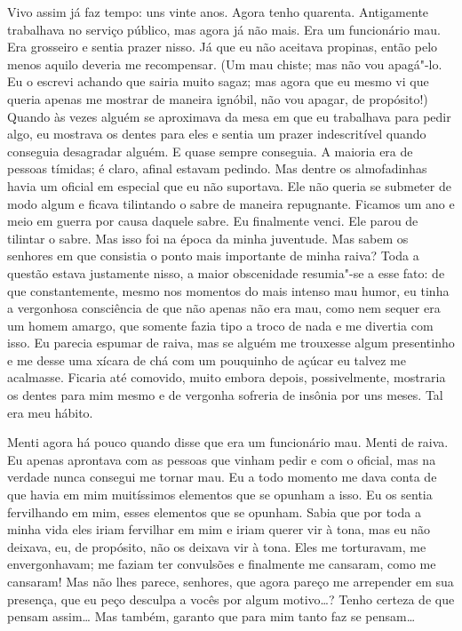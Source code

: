 Vivo assim já faz tempo: uns vinte anos. Agora tenho quarenta.
Antigamente trabalhava no serviço público, mas agora já não mais. Era
um funcionário mau. Era grosseiro e sentia prazer nisso. Já que eu não
aceitava propinas, então pelo menos aquilo deveria me recompensar. (Um
mau chiste; mas não vou apagá"-lo. Eu o escrevi achando que sairia muito
sagaz; mas agora que eu mesmo vi que queria apenas me mostrar de
maneira ignóbil, não vou apagar, de propósito!) Quando às vezes alguém
se aproximava da mesa em que eu trabalhava para pedir algo, eu mostrava
os dentes para eles e sentia um prazer indescritível quando conseguia
desagradar alguém. E quase sempre conseguia. A maioria era de pessoas
tímidas; é claro, afinal estavam pedindo. Mas dentre os almofadinhas
havia um oficial em especial que eu não suportava. Ele não queria se
submeter de modo algum e ficava tilintando o sabre de maneira
repugnante. Ficamos um ano e meio em guerra por causa daquele sabre. Eu
finalmente venci. Ele parou de tilintar o sabre. Mas isso foi na época
da minha juventude. Mas sabem os senhores em que consistia o ponto mais
importante de minha raiva? Toda a questão estava justamente nisso, a
maior obscenidade resumia"-se a esse fato: de que constantemente, mesmo
nos momentos do mais intenso mau humor, eu tinha a vergonhosa
consciência de que não apenas não era mau, como nem sequer era um homem
amargo, que somente fazia tipo a troco de nada e me divertia com isso.
Eu parecia espumar de raiva, mas se alguém me trouxesse algum
presentinho e me desse uma xícara de chá com um pouquinho de açúcar eu
talvez me acalmasse. Ficaria até comovido, muito embora depois,
possivelmente, mostraria os dentes para mim mesmo e de vergonha
sofreria de insônia por uns meses. Tal era meu hábito.

Menti agora há pouco quando disse que era um funcionário mau. Menti de
raiva. Eu apenas aprontava com as pessoas que vinham pedir e com o
oficial, mas na verdade nunca consegui me tornar mau. Eu a todo momento
me dava conta de que havia em mim muitíssimos elementos que se opunham
a isso. Eu os sentia fervilhando em mim, esses elementos que se
opunham. Sabia que por toda a minha vida eles iriam fervilhar em mim e
iriam querer vir à tona, mas eu não deixava, eu, de propósito, não os
deixava vir à tona. Eles me torturavam, me envergonhavam; me faziam ter
convulsões e finalmente me cansaram, como me cansaram! Mas não lhes
parece, senhores, que agora pareço me arrepender em sua presença, que
eu peço desculpa a vocês por algum motivo\ldots{}? Tenho certeza de que
pensam assim\ldots{} Mas também, garanto que para mim tanto faz se pensam\ldots{}

